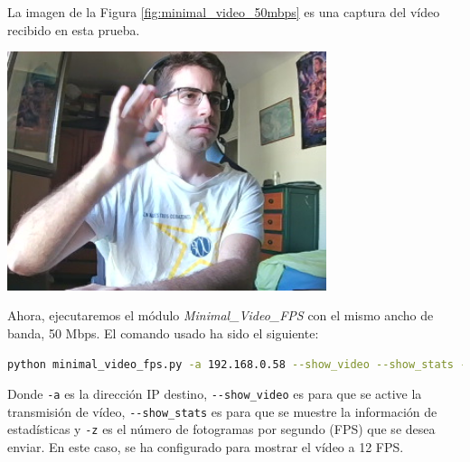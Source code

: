 \newpage

La imagen de la Figura \ref{fig:minimal_video_50mbps} es una captura del vídeo recibido en esta prueba.
\begin{center}
  \includegraphics[width = 0.7\textwidth]{images/VideoRecibido3.1.png}
  \label{fig:minimal_video_50mbps}
\end{center}

\newpage
Ahora, ejecutaremos el módulo \textit{Minimal\_Video\_FPS} con el mismo ancho de banda, 50 Mbps. El comando usado ha sido el siguiente:
\begin{lstlisting}[language=bash, basicstyle=\ttfamily\scriptsize]
    python minimal_video_fps.py -a 192.168.0.58 --show_video --show_stats -z 12
\end{lstlisting}
Donde \verb|-a| es la dirección IP destino, \verb|--show_video| es para que se active la transmisión de vídeo, \verb|--show_stats| es para que se muestre la información de estadísticas y \verb|-z| es el número de fotogramas por segundo (FPS) que se desea enviar. En este caso, se ha configurado para mostrar el vídeo a 12 FPS.
\vspace{\baselineskip}

